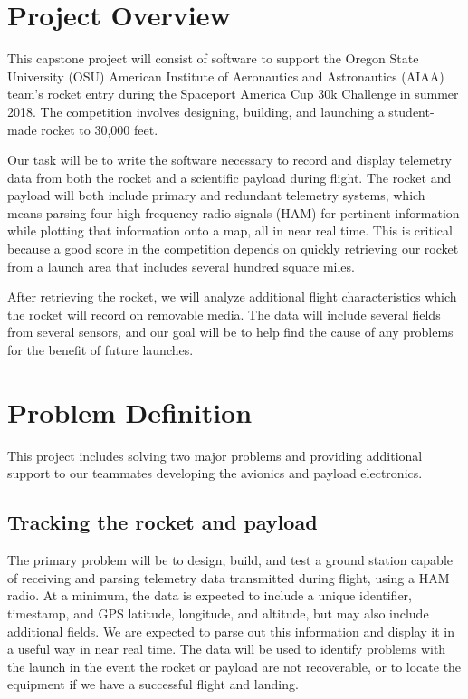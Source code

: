 \documentclass[onecolumn, draftclsnofoot,10pt, compsoc]{IEEEtran}
\begin{document}
\section{Project Overview}
This capstone project will consist of software to support the Oregon State University (OSU) American Institute of Aeronautics and Astronautics (AIAA) team's rocket entry during the Spaceport America Cup 30k Challenge in summer 2018.  The competition involves designing, building, and launching a student-made rocket to 30,000 feet.

Our task will be to write the software necessary to record and display telemetry data from both the rocket and a scientific payload during flight.  The rocket and payload will both include primary and redundant telemetry systems, which means parsing four high frequency radio signals (HAM) for pertinent information while plotting that information onto a map, all in near real time.  This is critical because a good score in the competition depends on quickly retrieving our rocket from a launch area that includes several hundred square miles.

After retrieving the rocket, we will analyze additional flight characteristics which the rocket will record on removable media.  The data will include several fields from several sensors, and our goal will be to help find the cause of any problems for the benefit of future launches.

\section{Problem Definition}
This project includes solving two major problems and providing additional support to our teammates developing the avionics and payload electronics.

\subsection{Tracking the rocket and payload}
The primary problem will be to design, build, and test a ground station capable of receiving and parsing telemetry data transmitted during flight, using a HAM radio.  At a minimum, the data is expected to include a unique identifier, timestamp, and GPS latitude, longitude, and altitude, but may also include additional fields.  We are expected to parse out this information and display it in a useful way in near real time.  The data will be used to identify problems with the launch in the event the rocket or payload are not recoverable, or to locate the equipment if we have a successful flight and landing.
\end{document}
